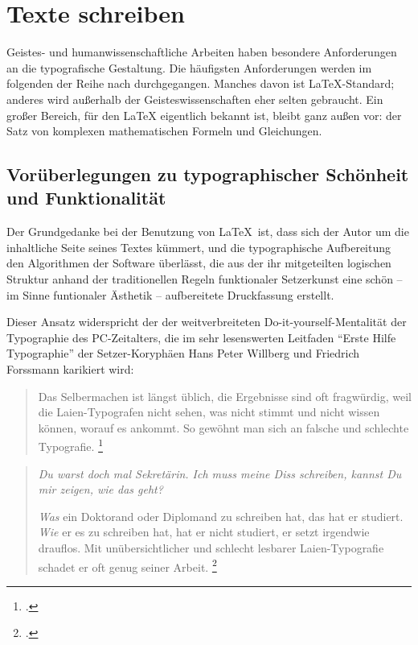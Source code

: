 
\chapter{Texte schreiben}

Geistes- und humanwissenschaftliche Arbeiten haben besondere Anforderungen an die typografische
Gestaltung. 
Die häufigsten Anforderungen werden im folgenden der Reihe nach durchgegangen.
Manches davon ist \LaTeX-Standard; anderes wird außerhalb der Geisteswissenschaften eher
selten gebraucht.
Ein großer Bereich, für den \LaTeX{} eigentlich bekannt ist, bleibt ganz außen vor:
der Satz von komplexen mathematischen Formeln und Gleichungen.


\section{Vorüberlegungen zu typographischer Schönheit und Funktionalität}


Der Grundgedanke bei der Benutzung von \LaTeX\ ist, dass sich der Autor um die inhaltliche Seite seines
Textes kümmert, und die typographische Aufbereitung den Algorithmen der Software überlässt, 
die aus der ihr mitgeteilten logischen Struktur anhand der traditionellen Regeln funktionaler Setzerkunst 
eine schön -- im Sinne funtionaler Ästhetik -- aufbereitete Druckfassung erstellt.

Dieser Ansatz widerspricht der der weitverbreiteten Do-it-yourself-Mentalität der Typographie des
PC-Zeitalters, die im sehr lesenswerten Leitfaden \enquote{Erste Hilfe Typographie} der Setzer-Koryphäen
Hans Peter Willberg und Friedrich Forssmann karikiert wird:

\begin{quote}
 Das Selbermachen ist längst üblich, die Ergebnisse sind oft fragwürdig,
 weil die Laien-Typografen nicht sehen, was nicht stimmt und nicht wissen
 können, worauf es ankommt.
 So gewöhnt man sich an falsche und schlechte Typografie.
 \footcite[9]{erste_hilfe}
 \end{quote}
 
\begin{quotation}
 \emph{Du warst doch mal Sekretärin.
 Ich muss meine Diss schreiben, kannst Du mir zeigen, wie das geht?}
 
 \emph{Was} ein Doktorand oder Diplomand zu schreiben hat, das hat er studiert.
 \emph{Wie} er es zu schreiben hat, hat er nicht studiert, er setzt irgendwie drauflos.
 Mit unübersichtlicher und schlecht lesbarer Laien-Typografie schadet er oft genug seiner Arbeit.
 \footcite[86]{erste_hilfe}
\end{quotation}


